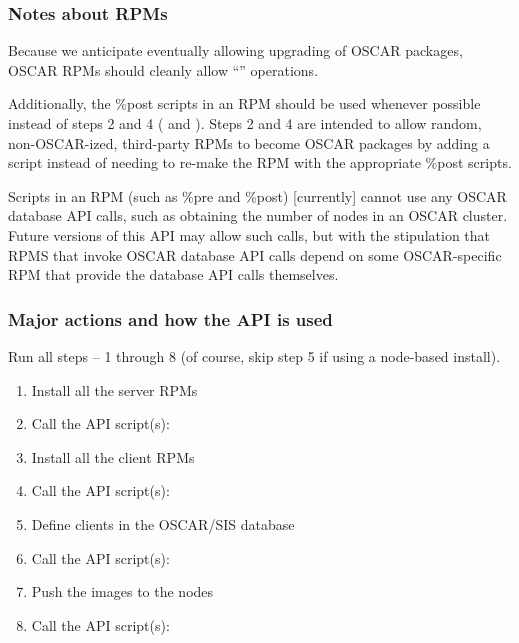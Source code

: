 
\subsubsection{Notes about RPMs}

Because we anticipate eventually allowing upgrading of OSCAR packages,
OSCAR RPMs should cleanly allow ``'' operations.

Additionally, the \%post scripts in an RPM should be used whenever
possible instead of steps 2 and 4
( and
).  Steps 2 and 4 are intended
to allow random, non-OSCAR-ized, third-party RPMs to become OSCAR
packages by adding a script instead of needing to re-make the RPM with
the appropriate \%post scripts.

Scripts in an RPM (such as \%pre and \%post) [currently] cannot use any
OSCAR database API calls, such as obtaining the number of nodes in an
OSCAR cluster.  Future versions of this API may allow such calls, but
with the stipulation that RPMS that invoke OSCAR database API calls
depend on some OSCAR-specific RPM that provide the database API calls
themselves.


\subsubsection{Major actions and how the API is used}


Run all steps -- 1 through 8 (of course, skip step 5 if using a
node-based install).

\begin{enumerate}
\item Install all the server RPMs
\item Call the API script(s): 
\item Install all the client RPMs
\item Call the API script(s): 
\item Define clients in the OSCAR/SIS database
\item Call the API script(s): 
\item Push the images to the nodes
\item Call the API script(s): 
\end{enumerate}


